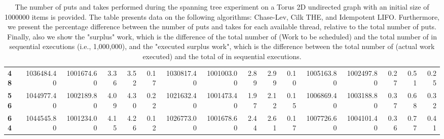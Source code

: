 \begin{table}[!ht]
{\begin{tabular}{lrrrrrrrrrrrrrrr}
\textbf{48} & 1036484.40 & 1001674.60 &           3.36 &        3.52 &                 0.17 & 1030817.40 & 1001003.00 &           2.89 &        2.99 &                 0.10 &      1005163.80 & 1002497.80 &           0.27 &        0.51 &                 0.25 \\
\textbf{56} & 1044977.40 & 1002189.80 &           4.09 &        4.30 &                 0.22 & 1021632.40 & 1001473.40 &           1.97 &        2.12 &                 0.15 &      1006869.40 & 1003188.80 &           0.37 &        0.68 &                 0.32 \\
\textbf{64} & 1044545.80 & 1001234.00 &           4.15 &        4.26 &                 0.12 & 1026773.00 & 1001678.60 &           2.44 &        2.61 &                 0.17 &      1007726.60 & 1004101.40 &           0.36 &        0.77 &                 0.41 \\
\bottomrule
\end{tabular}}
\label{difference-Torus_2D_undirected-1000000-CHASELEV-CILK-IDEMPOTENT_LIFO}
\caption{The number of puts and takes performed during the
    spanning tree experiment on a Torus 2D undirected graph with an initial size
    of 1000000 items is provided. The table presents data on the
    following algorithms: Chase-Lev, Cilk THE, and
    Idempotent LIFO. Furthermore, we present the percentage difference
    between the number of puts and takes for each available thread,
    relative to the total number of puts. Finally, also we show the
    "surplus" work, which is the difference of the total number of
    \Puts (Work to be scheduled) and the total number of \Puts in
    sequential executions (i.e., 1,000,000), and the "executed surplus
    work", which is the difference between the total number of \Takes
    (actual work executed) and the total of \Takes in sequential
    executions.}
\end{table}
